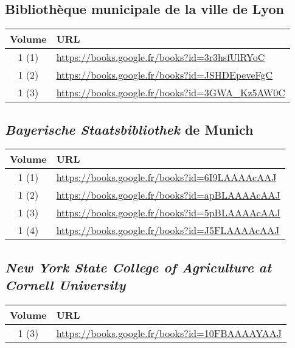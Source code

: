 \subsection{Bibliothèque municipale de la ville de Lyon}
\begin{center}
\begin{tabular}{ | c | p{13cm} | }
\hline
Volume & URL \\ \hline
1 (1) & \url{https://books.google.fr/books?id=3r3hsfUlRYoC} \\ \hline
1 (2) & \url{https://books.google.fr/books?id=JSHDEpeveFgC} \\ \hline
1 (3) & \url{https://books.google.fr/books?id=3GWA_Kz5AW0C} \\ \hline
\end{tabular}
\end{center}

\subsection{\textit{Bayerische Staatsbibliothek} de Munich}
\begin{center}
\begin{tabular}{ | c | p{13cm} | }
\hline
Volume & URL \\ \hline
1 (1) & \url{https://books.google.fr/books?id=6I9LAAAAcAAJ} \\ \hline
1 (2) & \url{https://books.google.fr/books?id=apBLAAAAcAAJ} \\ \hline
1 (3) & \url{https://books.google.fr/books?id=5pBLAAAAcAAJ} \\ \hline
1 (4) & \url{https://books.google.fr/books?id=J5FLAAAAcAAJ} \\ \hline
\end{tabular}
\end{center}

\subsection{\textit{New York State College of Agriculture at Cornell University}}
\begin{center}
\begin{tabular}{ | c | p{13cm} | }
\hline
Volume & URL \\ \hline
1 (3) & \url{https://books.google.fr/books?id=10FBAAAAYAAJ} \\ \hline
\end{tabular}
\end{center}



